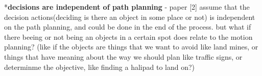 \documentclass{article}
\begin{document}
	*\textbf{decisions are independent of path planning} - paper [2] assume that the decision actions(deciding is there an object in some place or not) is independent on the path planning, and could be done in the end of the process. but what if there beeing or not being an objects in a certain spot does relate to the motion planning? (like if the objects are things that we want to avoid like land mines, or things that have meaning about the way we should plan like traffic signs, or determinme the objective, like finding a halipad to land on?)
		
	
	
  
\end{document}
